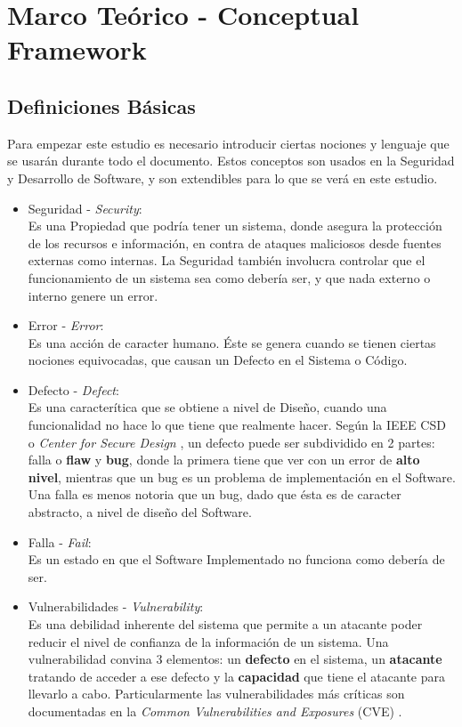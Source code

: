\chapter{Marco Teórico - Conceptual Framework}
\label{chap2:FC}


\section{Definiciones Básicas}
\label{chap2:Def}

Para empezar este estudio es necesario introducir ciertas nociones y lenguaje que se usarán durante todo el documento. Estos conceptos son usados en la Seguridad y Desarrollo de Software, y son extendibles para lo que se verá en este estudio.

\begin{itemize}
    \item Seguridad - \textit{Security}:
        \\Es una Propiedad que podría tener un sistema, donde asegura la protección de los recursos e información, en contra de ataques maliciosos desde fuentes externas como internas. La Seguridad también involucra controlar que el funcionamiento de un sistema sea como debería ser, y que nada externo o interno genere un error.
    \item Error - \textit{Error}:
        \\Es una acción de caracter humano. Éste se genera cuando se tienen ciertas nociones equivocadas, que causan un Defecto en el Sistema o Código.
    \item Defecto  - \textit{Defect}:
        \\Es una caracterítica que se obtiene a nivel de Diseño, cuando una funcionalidad no hace lo que tiene que realmente hacer. Según la IEEE CSD o \textit{Center for Secure Design} \cite{ieeecsd2}, un defecto puede ser subdividido en 2 partes: falla o \textbf{flaw} y \textbf{bug}, donde la primera tiene que ver con un error de \textbf{alto nivel}, mientras que un bug es un problema de implementación en el Software. Una falla es menos notoria que un bug, dado que ésta es de caracter abstracto, a nivel de diseño del Software.
    \item Falla - \textit{Fail}:
        \\Es un estado en que el Software Implementado no funciona como debería de ser.
    \item Vulnerabilidades - \textit{Vulnerability}:
        \\Es una debilidad inherente del sistema que permite a un atacante poder reducir el nivel de confianza de la información de un sistema. Una vulnerabilidad convina 3 elementos: un \textbf{defecto} en el sistema, un \textbf{atacante} tratando de acceder a ese defecto y la \textbf{capacidad} que tiene el atacante para llevarlo a cabo. Particularmente las vulnerabilidades más críticas son documentadas en la \textit{Common Vulnerabilities and Exposures} (CVE) \cite{cve}.

\end{itemize}
